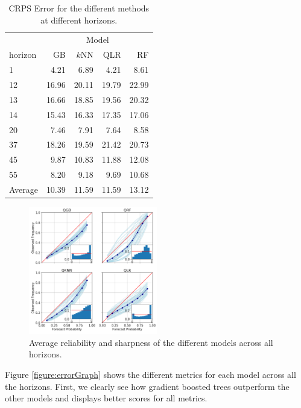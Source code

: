 \documentclass[a4paper,twocolumn,5p]{elsarticle}
\begin{document}
\begin{table}[tbp]
  \centering
  \caption{\label{tab:determ}CRPS Error for the different methods at different
    horizons.%
  }
  \begin{tabular}{lrrrr}
    \toprule
    & \multicolumn{4}{c}{Model} \\ \cmidrule{2-5} 
    horizon &    GB &   $k$NN &   QLR &    RF \\
    \midrule
    1     &  4.21 &  6.89 &  4.21 &  8.61 \\
12    & 16.96 & 20.11 & 19.79 & 22.99 \\
13    & 16.66 & 18.85 & 19.56 & 20.32 \\
14    & 15.43 & 16.33 & 17.35 & 17.06 \\
20    &  7.46 &  7.91 &  7.64 &  8.58 \\
37    & 18.26 & 19.59 & 21.42 & 20.73 \\
45    &  9.87 & 10.83 & 11.88 & 12.08 \\
55    &  8.20 &  9.18 &  9.69 & 10.68 \\
    \midrule
    Average & 10.39 & 11.59 & 11.59 & 13.12 \\
    \bottomrule
  \end{tabular}
\end{table}

\begin{figure}
  \centering
  \includegraphics[width=0.5\textwidth]{reliability_sharpness}
  \caption{\label{figure:rel_sharp}Average reliability and sharpness
    of the different models across all horizons.}
\end{figure}

Figure \ref{figure:errorGraph} shows the different metrics for each
model across all the horizons. First, we clearly see how gradient
boosted trees outperform the other models and displays better scores
for all metrics.
\end{document}
